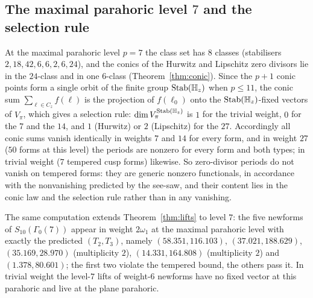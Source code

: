 \documentclass[11pt]{amsart}
\theoremstyle{definition}
\newcommand{\Stab}{\operatorname{Stab}}\newcommand{\Aut}{\operatorname{Aut}}\newcommand{\Der}{\operatorname{Der}}\renewcommand{\Im}{\operatorname{Im}}
\begin{document}
\subsection{The maximal parahoric level $7$ and the selection rule}
At the maximal parahoric level $p=7$ the class set has $8$ classes (stabilisers $2,18,42,6,6,2,6,24$), and the conics of the Hurwitz and Lipschitz zero divisors lie in the $24$-class and in one $6$-class (Theorem~\ref{thm:conic}). Since the $p+1$ conic points form a single orbit of the finite group $\Stab(\Hq_z)$ when $p\le 11$, the conic sum $\sum_{\ell\in C_z}f(\ell)$ is the projection of $f(\ell_0)$ onto the $\Stab(\Hq_z)$-fixed vectors of $V_\pi$, which gives a selection rule: $\dim V_\pi^{\Stab(\Hq_z)}$ is $1$ for the trivial weight, $0$ for the $7$ and the $14$, and $1$ (Hurwitz) or $2$ (Lipschitz) for the $27$. Accordingly all conic sums vanish identically in weights $7$ and $14$ for every form, and in weight $27$ ($50$ forms at this level) the periods are nonzero for every form and both types; in trivial weight ($7$ tempered cusp forms) likewise. So zero-divisor periods do not vanish on tempered forms: they are generic nonzero functionals, in accordance with the nonvanishing predicted by the see-saw, and their content lies in the conic law and the selection rule rather than in any vanishing.

The same computation extends Theorem~\ref{thm:lifts} to level $7$: the five newforms of $S_{10}(\Gamma_0(7))$ appear in weight $2\omega_1$ at the maximal parahoric level with exactly the predicted $(T_2,T_3)$, namely $(58.351,116.103)$, $(37.021,188.629)$, $(35.169,28.970)$ (multiplicity $2$), $(14.331,164.808)$ (multiplicity $2$) and $(1.378,80.601)$; the first two violate the tempered bound, the others pass it. In trivial weight the level-$7$ lifts of weight-$6$ newforms have no fixed vector at this parahoric and live at the plane parahoric.
\end{document}
